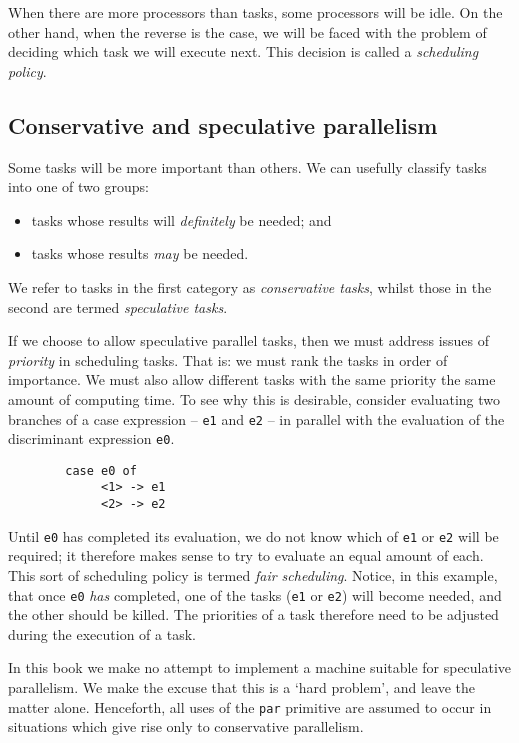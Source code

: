 When there are more processors than tasks, some processors will be
idle. On the other hand, when the reverse is the case, we will be
faced with the problem of deciding which task we will execute next.
This decision is called a {\em scheduling policy}.

\subsection{Conservative and speculative parallelism}

Some tasks will be more important than others. We can usefully
classify tasks into one of two groups:
\begin{itemize}
\item tasks whose results will {\em definitely\/} be needed; and
\item tasks whose results {\em may\/} be needed.
\end{itemize}
We refer to tasks in the first category as {\em conservative
tasks}, whilst those in the second are
termed {\em speculative tasks}.

If we choose to allow speculative parallel tasks, then we must address
issues of {\em priority\/} in scheduling
tasks. That is: we must rank the tasks in order of importance. We
must also allow different tasks with the same priority the same amount
of computing time. To see why this is desirable, consider evaluating
two branches of a case expression -- \mbox{\tt e1} and \mbox{\tt e2} -- in parallel with
the evaluation of the discriminant expression \mbox{\tt e0}.
\begin{verbatim}
        case e0 of
             <1> -> e1
             <2> -> e2
\end{verbatim}
Until \mbox{\tt e0} has completed its evaluation, we do not know which of \mbox{\tt e1}
or \mbox{\tt e2} will be required; it therefore makes sense to try to evaluate
an equal amount of each. This sort of scheduling policy is termed
{\em fair scheduling}.
Notice, in this example, that once \mbox{\tt e0} {\em has\/} completed, one of
the tasks (\mbox{\tt e1} or \mbox{\tt e2}) will become needed, and the other should be
killed. The priorities of a task therefore need to be adjusted during
the execution of a task.

In this book we make no attempt to implement a machine suitable for
speculative parallelism. We make the excuse that this is a `hard
problem', and leave the matter alone. Henceforth, all uses of the
\mbox{\tt par} primitive are assumed to occur in situations which give rise only to
conservative parallelism.

